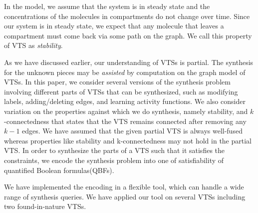 %
In the model, we assume that the system is in steady state and the
concentrations of the molecules in compartments do not change over
time.
%
Since our system is in steady state, we expect that any molecule that
leaves a compartment must come back via some path on the graph.
%
We call this property of VTS as {\em stability}.

%
As we have discussed earlier, our understanding of VTSs is partial.
%
%
%
%
The synthesis for the unknown pieces may be {\em assisted} by computation on
the graph model of VTSs.
%
In this paper, we consider several versions of the synthesis problem
involving different parts of VTSs that can be synthesized, such as
modifying labels, adding/deleting edges, and learning activity functions.
%
We also consider variation on the properties against which we do
synthesis, namely stability, and $k$-connectedness that states that the VTS remains connected after removing any $k-1$ edges.
%
We have assumed that the given partial VTS is always well-fused whereas properties like stability and k-connectedness may not hold in the partial VTS.
%
In order to synthesize the parts of a VTS such that it satisfies the
constraints, we encode the synthesis problem into one of satisfiability of
quantified Boolean formulas(QBFs). 
%

We have implemented the encoding in a flexible tool,
which can handle a wide range of synthesis queries.
%
We have applied our tool on several VTSs including two found-in-nature
VTSs.
%
% 

